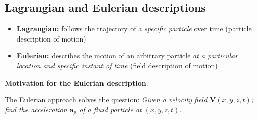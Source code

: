 \documentclass[a4paper, 12pt]{article}
\numberwithin{equation}{subsubsection}
\begin{document}
\subsection{Lagrangian and Eulerian descriptions}
\begin{itemize}
	\item \textbf{Lagrangian:} follows the trajectory of a \textit{specific particle} over time (particle description of motion)
	\item \textbf{Eulerian:} describes the motion of an arbitrary particle \textit{at a particular location and specific instant of time} (field description of motion)
\end{itemize}

\textbf{Motivation for the Eulerian description}:

The Eulerian approach solves the question: \textit{Given a velocity field $\mathbf{V}(x, y, z, t)$; find the acceleration $\mathbf{a}_p$ of a fluid particle at $(x, y, z, t)$.}
\end{document}
